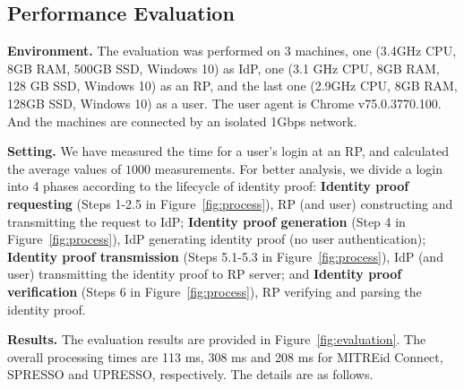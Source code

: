 \subsection{Performance Evaluation}
\label{sec:evaluation}
\noindent\textbf{Environment.} The evaluation was performed on 3 machines, one (3.4GHz CPU, 8GB RAM, 500GB SSD, Windows 10) as IdP, one (3.1 GHz CPU, 8GB RAM, 128 GB SSD, Windows 10) as an RP, and the last one (2.9GHz CPU, 8GB RAM, 128GB SSD, Windows 10) as a user. The user agent is Chrome v75.0.3770.100. And the machines are connected by an isolated 1Gbps network.


\noindent\textbf{Setting.} We have measured the time for a user's login at an RP, and calculated the average values of $1000$ measurements.
For better analysis, we divide a login into 4 phases according to the lifecycle of identity proof: \textbf{Identity proof requesting} (Steps 1-2.5 in Figure~\ref{fig:process}), RP (and user) constructing and transmitting the request to IdP; \textbf{Identity proof generation} (Step 4 in Figure~\ref{fig:process}), IdP generating identity proof (no user authentication); \textbf{Identity proof transmission} (Steps 5.1-5.3 in Figure~\ref{fig:process}), IdP (and user) transmitting the identity proof to RP server; and \textbf{Identity proof verification} (Steps 6 in Figure~\ref{fig:process}), RP verifying and parsing the identity proof.

\noindent\textbf{Results.}
The evaluation results are provided in Figure~\ref{fig:evaluation}. The overall processing times are  113 ms, 308 ms and 208 ms for MITREid Connect, SPRESSO and UPRESSO, respectively. The details are as follows.

